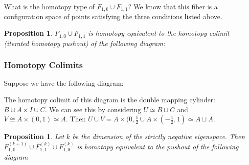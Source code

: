 \documentclass{article}
\newtheorem{proposition}[theorem]{Proposition}
\newtheorem{proposed work}[theorem]{Proposed Work}
\theoremstyle{definition}
\begin{document}
What is the homotopy type of $F_{1,0}\cup F_{1,1}$? We know that this fiber is a configuration space of points satisfying the three conditions listed above.\\

\begin{proposition}\label{F10_F11}
$F_{1,0}\cup F_{1,1}$ is homotopy equivalent to the homotopy colimit (iterated homotopy pushout) of the following diagram:\\
\begin{center}
	\end{center}
\end{proposition}

\subsubsection{Homotopy Colimits}
Suppose we have the following diagram:
\begin{center}
\end{center}

The homotopy colimit of this diagram is the double mapping cylinder: $B\cup A\times I \cup C$. We can see this by considering $U\simeq B\sqcup C$ and $V\cong A\times (0,1)\simeq A$. Then $U\cup V=A\times (0,\frac{1}{2}\cup A\times (-\frac{1}{2},1)\simeq A\sqcup A$.\\

\begin{proposition}
Let $k$ be the dimension of the strictly negative eigenspace. Then $F_{1,0}^{(k+1)}\cup F_{1,1}^{(k)}\cup F_{1,0}^{(k)}$ is homotopy equivalent to the pushout of the following diagram
	\begin{center}
	\end{center}
\end{proposition}
\end{document}
